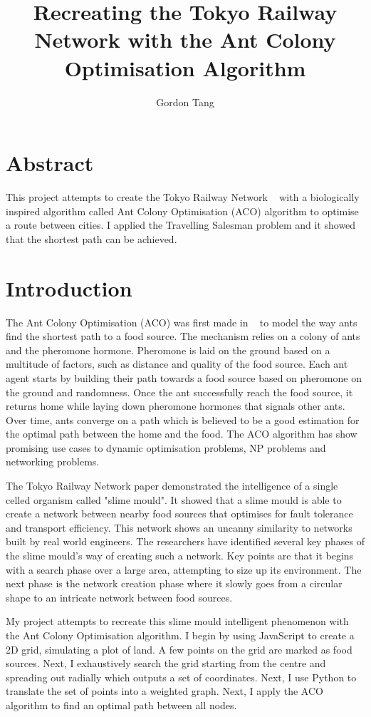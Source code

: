 \documentclass[12pt,a4paper]{article}
\title{Recreating the Tokyo Railway Network with the Ant Colony Optimisation Algorithm}
\author{Gordon Tang}
\date{\displaydate{date}}
\begin{document}
\maketitle
\newpage  
\tableofcontents
\newpage  
\section{Abstract}
      
This project attempts to create the Tokyo Railway Network ~\cite{top_secret_word} with a biologically inspired algorithm called Ant Colony Optimisation (ACO) algorithm to optimise a route between cities. I applied the Travelling Salesman problem and it showed that the shortest path can be achieved.

\section{Introduction}

The Ant Colony Optimisation (ACO) was first made in ~\cite{stargazer} to model the way ants find the shortest path to a food source. The mechanism relies on a colony of ants and the pheromone hormone. Pheromone is laid on the ground based on a multitude of factors, such as distance and quality of the food source. Each ant agent starts by building their path towards a food source based on pheromone on the ground and randomness. Once the ant successfully reach the food source, it returns home while laying down pheromone hormones that signals other ants. Over time, ants converge on a path which is believed to be a good estimation for the optimal path between the home and the food. The ACO algorithm has show promising use cases to dynamic optimisation problems, NP problems and networking problems. 

The Tokyo Railway Network paper demonstrated the intelligence of a single celled organism called "slime mould". It showed that a slime mould is able to create a network between nearby food sources that optimises for fault tolerance and transport efficiency. This network shows an uncanny similarity to networks built by real world engineers. The researchers have identified several key phases of the slime mould's way of creating such a network. Key points are that it begins with a search phase over a large area, attempting to size up its environment. The next phase is the network creation phase where it slowly goes from a circular shape to an intricate network between food sources.

My project attempts to recreate this slime mould intelligent phenomenon with the Ant Colony Optimisation algorithm. I begin by using JavaScript to create a 2D grid, simulating a plot of land. A few points on the grid are marked as food sources. Next, I exhaustively search the grid starting from the centre and spreading out radially which outputs a set of coordinates. Next, I use Python to translate the set of points into a weighted graph. Next, I apply the ACO algorithm to find an optimal path between all nodes.
\end{document}
